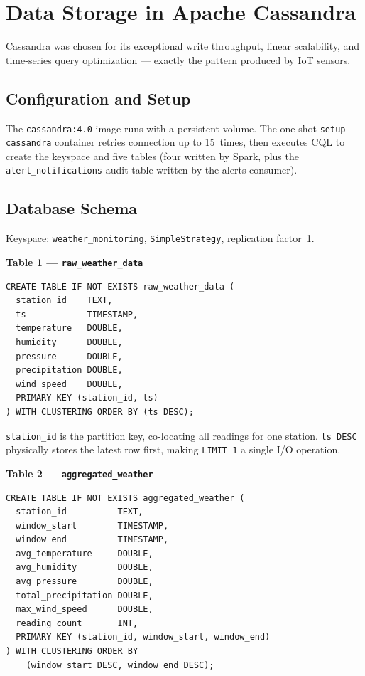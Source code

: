 \documentclass[conference,a4paper]{IEEEtran}
\begin{document}
\section{Data Storage in Apache Cassandra}

Cassandra was chosen for its exceptional write throughput, linear scalability, and time-series query optimization --- exactly the pattern produced by IoT sensors.

\subsection{Configuration and Setup}

The \texttt{cassandra:4.0} image runs with a persistent volume. The one-shot \texttt{setup-cassandra} container retries connection up to 15~times, then executes CQL to create the keyspace and five tables (four written by Spark, plus the \texttt{alert\_notifications} audit table written by the alerts consumer).

\subsection{Database Schema}

Keyspace: \texttt{weather\_monitoring}, \texttt{SimpleStrategy}, replication factor~1.

\textbf{Table 1 --- \texttt{raw\_weather\_data}}

\begin{lstlisting}[language=CQL]
CREATE TABLE IF NOT EXISTS raw_weather_data (
  station_id    TEXT,
  ts            TIMESTAMP,
  temperature   DOUBLE,
  humidity      DOUBLE,
  pressure      DOUBLE,
  precipitation DOUBLE,
  wind_speed    DOUBLE,
  PRIMARY KEY (station_id, ts)
) WITH CLUSTERING ORDER BY (ts DESC);
\end{lstlisting}

\texttt{station\_id} is the partition key, co-locating all readings for one station. \texttt{ts DESC} physically stores the latest row first, making \texttt{LIMIT~1} a single I/O operation.

\textbf{Table 2 --- \texttt{aggregated\_weather}}

\begin{lstlisting}[language=CQL]
CREATE TABLE IF NOT EXISTS aggregated_weather (
  station_id          TEXT,
  window_start        TIMESTAMP,
  window_end          TIMESTAMP,
  avg_temperature     DOUBLE,
  avg_humidity        DOUBLE,
  avg_pressure        DOUBLE,
  total_precipitation DOUBLE,
  max_wind_speed      DOUBLE,
  reading_count       INT,
  PRIMARY KEY (station_id, window_start, window_end)
) WITH CLUSTERING ORDER BY
    (window_start DESC, window_end DESC);
\end{lstlisting}
\end{document}
